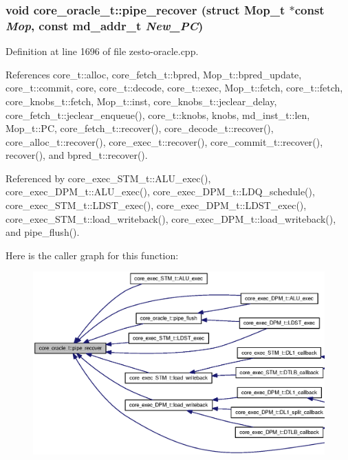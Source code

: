 \subsubsection[{pipe\_\-recover}]{\setlength{\rightskip}{0pt plus 5cm}void core\_\-oracle\_\-t::pipe\_\-recover (struct {\bf Mop\_\-t} $\ast$const  {\em Mop}, \/  const {\bf md\_\-addr\_\-t} {\em New\_\-PC})}\label{classcore__oracle__t_c687f6e9c8564e5fd108ca8c9f771dce}




Definition at line 1696 of file zesto-oracle.cpp.

References core\_\-t::alloc, core\_\-fetch\_\-t::bpred, Mop\_\-t::bpred\_\-update, core\_\-t::commit, core, core\_\-t::decode, core\_\-t::exec, Mop\_\-t::fetch, core\_\-t::fetch, core\_\-knobs\_\-t::fetch, Mop\_\-t::inst, core\_\-knobs\_\-t::jeclear\_\-delay, core\_\-fetch\_\-t::jeclear\_\-enqueue(), core\_\-t::knobs, knobs, md\_\-inst\_\-t::len, Mop\_\-t::PC, core\_\-fetch\_\-t::recover(), core\_\-decode\_\-t::recover(), core\_\-alloc\_\-t::recover(), core\_\-exec\_\-t::recover(), core\_\-commit\_\-t::recover(), recover(), and bpred\_\-t::recover().

Referenced by core\_\-exec\_\-STM\_\-t::ALU\_\-exec(), core\_\-exec\_\-DPM\_\-t::ALU\_\-exec(), core\_\-exec\_\-DPM\_\-t::LDQ\_\-schedule(), core\_\-exec\_\-STM\_\-t::LDST\_\-exec(), core\_\-exec\_\-DPM\_\-t::LDST\_\-exec(), core\_\-exec\_\-STM\_\-t::load\_\-writeback(), core\_\-exec\_\-DPM\_\-t::load\_\-writeback(), and pipe\_\-flush().

Here is the caller graph for this function:\nopagebreak
\begin{figure}[H]
\begin{center}
\leavevmode
\includegraphics[width=403pt]{classcore__oracle__t_c687f6e9c8564e5fd108ca8c9f771dce_icgraph}
\end{center}
\end{figure}
